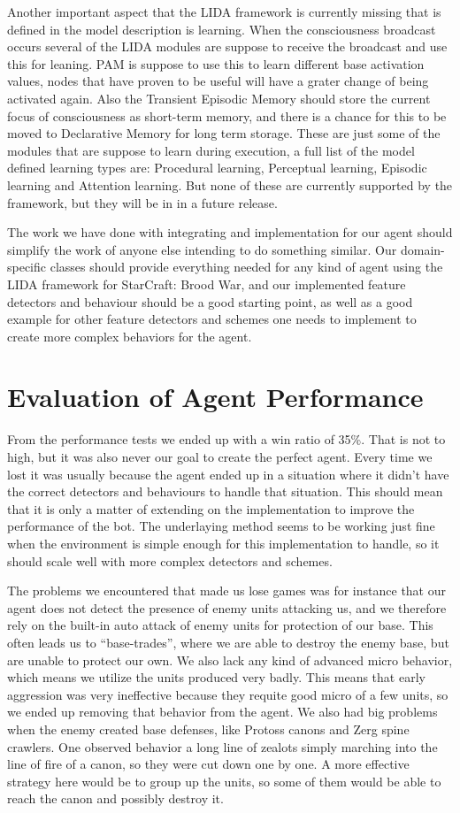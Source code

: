 Another important aspect that the LIDA framework is currently missing that is defined in the model description is learning. When the consciousness broadcast occurs several of the LIDA modules are suppose to receive the broadcast and use this for leaning. PAM is suppose to use this to learn different base activation values, nodes that have proven to be useful will have a grater change of being activated again. Also the Transient Episodic Memory should store the current focus of consciousness as short-term memory, and there is a chance for this to be moved to Declarative Memory for long term storage. These are just some of the modules that are suppose to learn during execution, a full list of the model defined learning types are: Procedural learning, Perceptual learning, Episodic learning and Attention learning. But none of these are currently supported by the framework, but they will be in in a future release.

The work we have done with integrating and  implementation for our agent should simplify the work of anyone else intending to do something similar. Our domain-specific classes should provide everything needed for any kind of agent using the LIDA framework for StarCraft: Brood War, and our implemented feature detectors and behaviour should be a good starting point, as well as a good example for other feature detectors and schemes one needs to implement to create more complex behaviors for the agent.


\section{Evaluation of Agent Performance}
From the performance tests we ended up with a win ratio of 35\%. That is not to high, but it was also never our goal to create the perfect agent. Every time we lost it was usually because the agent ended up in a situation where it didn't have the correct detectors and behaviours to handle that situation. This should mean that it is only a matter of extending on the implementation to improve the performance of the bot. The underlaying method seems to be working just fine when the environment is simple enough for this implementation to handle, so it should scale well with more complex detectors and schemes. 

The problems we encountered that made us lose games was for instance that our agent does not detect the presence of enemy units attacking us, and we therefore rely on the built-in auto attack of enemy units for protection of our base. This often leads us to ``base-trades'', where we are able to destroy the enemy base, but are unable to protect our own.
We also lack any kind of advanced micro behavior, which means we utilize the units produced very badly. This means that early aggression was very ineffective because they requite good micro of a few units, so we ended up removing that behavior from the agent. We also had big problems when the enemy created base defenses, like Protoss canons and Zerg spine crawlers. One observed behavior a long line of zealots simply marching into the line of fire of a canon, so they were cut down one by one. A more effective strategy here would be to group up the units, so some of them would be able to reach the canon and possibly destroy it.

